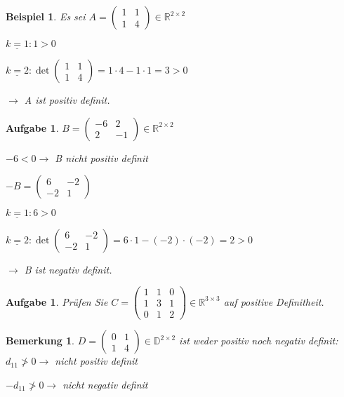 \documentclass[fontset=ubuntu,12pt,a4paper]{scrreprt}
\newtheorem{bemerkung}[defi]{Bemerkung}
\newtheorem{beispiel}[defi]{Beispiel}
\newtheorem{aufg}[defi]{Aufgabe}
\begin{document}
\begin{beispiel}
    Es sei \(A=\begin{pmatrix}
    1 & 1 \\ 1 & 4
    \end{pmatrix} \in \mathbb{R}^{2\times 2}\)
    
    \(\underline{k=1}:1>0\)
    
    \(\underline{k=2}: \det\begin{pmatrix}
    1 & 1 \\ 1 & 4
    \end{pmatrix} = 1\cdot4-1\cdot1=3>0\)
    
    \(\to\) A ist positiv definit.
\end{beispiel}

\begin{aufg}
    \(B=\begin{pmatrix}
    -6 & 2 \\ 2 & -1
    \end{pmatrix} \in \mathbb{R}^{2\times 2}\)
    
    \(-6<0 \to\) B nicht positiv definit
    
    \(-B=\begin{pmatrix}
    6 & -2 \\ -2 & 1
    \end{pmatrix}\)
    
    \(\underline{k=1}:6>0\)
    
    \(\underline{k=2}: \det\begin{pmatrix}
    6 & -2 \\ -2 & 1
    \end{pmatrix} = 6\cdot1 - (-2)\cdot(-2)=2>0\)
    
    \(\to\) B ist negativ definit.
\end{aufg}

\begin{aufg}
    Prüfen Sie \(C=\begin{pmatrix}
    1 & 1 & 0 \\ 1 & 3 & 1 \\ 0 & 1 & 2
    \end{pmatrix} \in \mathbb{R}^{3\times3}\) auf positive Definitheit.
\end{aufg}

\begin{bemerkung}
    \(D=\begin{pmatrix}
    0 & 1 \\ 1 & 4
    \end{pmatrix} \in \mathbb{D}^{2\times2}\) ist weder positiv noch negativ definit: \(d_{11}\not>0\to\) nicht positiv definit
    
    \(-d_{11}\not>0\to\) nicht negativ definit
\end{bemerkung}
\end{document}
